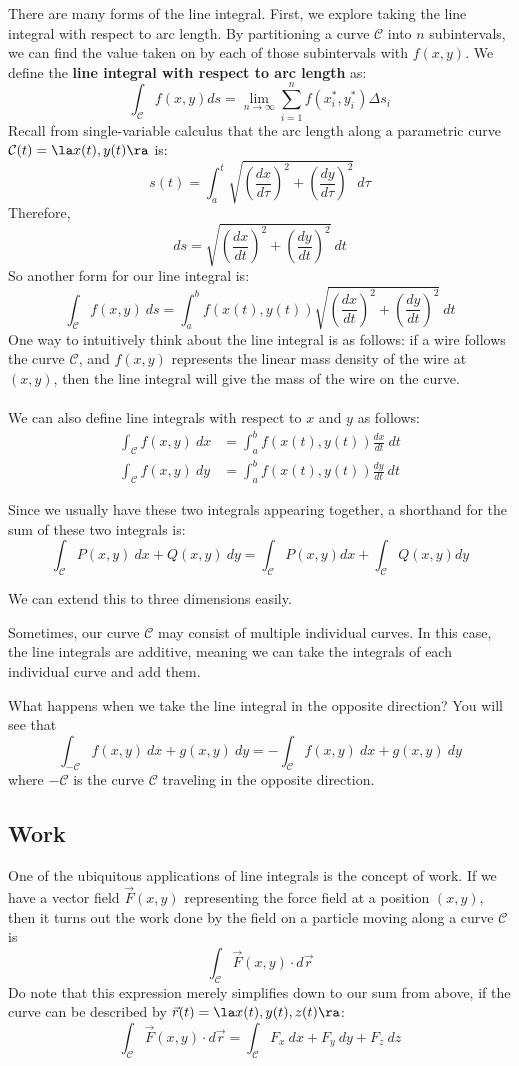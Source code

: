 \documentclass[12pt]{article}
\begin{document}
There are many forms of the line integral. First, we explore taking the line integral with respect to arc length. By partitioning a curve $\mathcal{C}$ into $n$ subintervals, we can find the value taken on by each of those subintervals with $f(x,y)$. We define the \textbf{line integral with respect to arc length} as: \[ \int_{\mathcal{C}}f(x,y) ds = \lim_{n \to \infty}\sum_{i=1}^nf(x_i^*,y_i^*)\Delta s_i \]
Recall from single-variable calculus that the arc length along a parametric curve $\mathcal{C}(t) = \la x(t), y(t) \ra$ is: \[ s(t) = \int_a^t\sqrt{\left(\frac{dx}{d\tau}\right)^2 + \left(\frac{dy}{d\tau}\right)^2} \ d\tau \]
Therefore, \[ ds = \sqrt{\left(\frac{dx}{dt}\right)^2 + \left(\frac{dy}{dt}\right)^2} \ dt \]
So another form for our line integral is:
\[ \boxed{\int_{\mathcal{C}}f(x,y) \ ds = \int_a^b f(x(t),y(t)) \sqrt{\left(\frac{dx}{dt}\right)^2 + \left(\frac{dy}{dt}\right)^2} \ dt} \]
One way to intuitively think about the line integral is as follows: if a wire follows the curve $\mathcal{C}$, and $f(x,y)$ represents the linear mass density of the wire at $(x,y)$, then the line integral will give the mass of the wire on the curve. \\ \\
We can also define line integrals with respect to $x$ and $y$ as follows:
\[
\begin{aligned}
\int_{\mathcal{C}}f(x,y) \ dx &= \int_a^b f(x(t),y(t))\frac{dx}{dt} \ dt \\
\int_{\mathcal{C}}f(x,y) \ dy &= \int_a^b f(x(t),y(t))\frac{dy}{dt} \ dt
\end{aligned}
\]

Since we usually have these two integrals appearing together, a shorthand for the sum of these two integrals is:
\[ \int_{\mathcal{C}}P(x,y) \ dx + Q(x,y) \ dy = \int_{\mathcal{C}}P(x,y) dx + \int_{\mathcal{C}} Q(x,y) dy \]

We can extend this to three dimensions easily.

Sometimes, our curve $\mathcal{C}$ may consist of multiple individual curves. In this case, the line integrals are additive, meaning we can take the integrals of each individual curve and add them. 

What happens when we take the line integral in the opposite direction? You will see that \[ \int_{-\mathcal{C}} f(x,y) \ dx + g(x,y) \ dy = -\int_{\mathcal{C}} f(x,y) \ dx + g(x,y) \ dy\] where $-\mathcal{C}$ is the curve $\mathcal{C}$ traveling in the opposite direction. 

\subsection{Work}
One of the ubiquitous applications of line integrals is the concept of work. If we have a vector field $\vec{F}(x,y)$ representing the force field at a position $(x,y)$, then it turns out the work done by the field on a particle moving along a curve $\mathcal{C}$ is \[ \int_{\mathcal{C}}\vec{F}(x,y) \cdot d\vec{r} \]
Do note that this expression merely simplifies down to our sum from above, if the curve can be described by $\vec{r}(t) = \la x(t),y(t),z(t) \ra$: \[ \int_{\mathcal{C}}\vec{F}(x,y) \cdot d\vec{r} = \int_{\mathcal{C}}F_x \ dx + F_y \ dy + F_z \ dz \]
\end{document}
